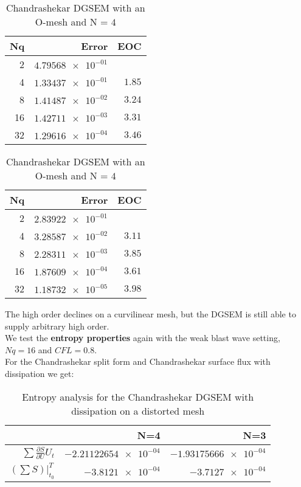 \documentclass[11pt]{scrartcl}
\begin{document}
\begin{table}[H]
\parbox{.45\linewidth}{
\centering
    \begin{tabular}{|r|r|r|}
    \hline\hline
    \textbf{Nq} & \textbf{Error} & \textbf{EOC} \\\hline
    2 & $\num{4.79568e-01}$ &  \\
    4 & $\num{1.33437e-01}$ & $\num{1.85}$ \\
    8 & $\num{1.41487e-02}$ & $\num{3.24}$ \\
    16 & $\num{1.42711e-03}$ & $\num{3.31}$ \\
    32 & $\num{1.29616e-04}$ & $\num{3.46}$ \\\hline\hline
  \end{tabular} 
  \caption{Chandrashekar DGSEM with an O-mesh and N = $3$}
  }
  \hspace{0.5cm}
  \parbox{.45\linewidth}{
	\centering
    \begin{tabular}{|r|r|r|}
    \hline\hline
    \textbf{Nq} & \textbf{Error} & \textbf{EOC} \\\hline
    2 & $\num{2.83922e-01}$ &  \\
    4 & $\num{3.28587e-02}$ & $\num{3.11}$ \\
    8 & $\num{2.28311e-03}$ & $\num{3.85}$ \\
    16 & $\num{1.87609e-04}$ & $\num{3.61}$ \\
    32 & $\num{1.18732e-05}$ & $\num{3.98}$ \\\hline\hline
  \end{tabular}
   \caption{Chandrashekar DGSEM with an O-mesh and N = $4$}
  }
\end{table}
The high order declines on a curvilinear mesh, but the DGSEM is still able to supply arbitrary high order. \\
We test the \textbf{entropy properties} again with the weak blast wave setting, $Nq = 16$ and $CFL=0.8$.\\
For the Chandrashekar split form and Chandrashekar surface flux with dissipation we get: \\
\begin{table}[H]
\centering
\begin{tabular}{|r|r|r|}
    \hline\hline
     & \textbf{N=4} & \textbf{N=3} \\\hline
    $\sum \frac{\partial S}{\partial U} U_t$ & $\num{-2.21122654e-04}$ & $\num{-1.93175666e-04}$ \\
    $\left( \sum S \right) |_{t_0}^{T}$ & $\num{-3.8121e-04}$ & $\num{-3.7127e-04}$ \\\hline\hline
\end{tabular}
\caption{Entropy analysis for the Chandrashekar DGSEM with dissipation on a distorted mesh}
\end{table}
\end{document}
